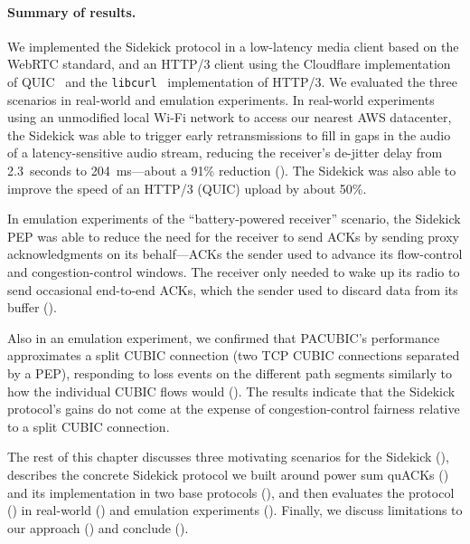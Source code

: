 \paragraph{Summary of results.}

We implemented the Sidekick protocol in a low-latency media client
based on the WebRTC standard, and an HTTP/3 client using the Cloudflare
implementation of QUIC~\cite{quiche} and the \texttt{libcurl}~\cite{libcurl}
implementation of HTTP/3. We evaluated the three scenarios in
real-world and emulation experiments.
In real-world experiments using an unmodified local Wi-Fi network to access our
nearest AWS datacenter, the Sidekick was able to trigger early retransmissions
to fill in gaps in the audio of a latency-sensitive audio stream, reducing the
receiver's de-jitter delay from 2.3~seconds to 204~ms---about a 91\% reduction
(). The Sidekick was also able to improve the
speed of an HTTP/3 (QUIC) upload by about 50\%.

In emulation experiments of the ``battery-powered receiver'' scenario,
the Sidekick PEP was able to reduce the need for the receiver to send ACKs
by sending proxy acknowledgments on its behalf---ACKs the sender used
to advance its flow-control and congestion-control windows. The
receiver only needed to wake up its radio to send occasional
end-to-end ACKs, which the sender used to discard data from its
buffer ().

Also in an emulation experiment, we confirmed that PACUBIC's
performance approximates a split CUBIC connection (two TCP CUBIC
connections separated by a PEP), responding to loss events on the
different path segments similarly to how the individual CUBIC flows would
(). The results indicate that the Sidekick
protocol's gains do not come at the
expense of congestion-control fairness relative to a split CUBIC connection.

\smallskip

The rest of this chapter discusses three motivating scenarios for the Sidekick
(), describes the concrete Sidekick protocol we
built around power sum quACKs () and
its implementation in two base protocols (),
and then evaluates the protocol () in real-world
() and emulation experiments
(). Finally, we discuss limitations to our approach
() and conclude ().
